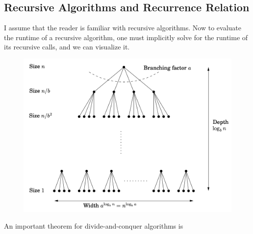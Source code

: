 \documentclass{article}
\begin{document}
  \subsection{Recursive Algorithms and Recurrence Relation}

    I assume that the reader is familiar with recursive algorithms. Now to evaluate the runtime of a recursive algorithm, one must implicitly solve for the runtime of its recursive calls, and we can visualize it. 

    \begin{figure}[H]
      \centering 
      \includegraphics[scale=0.4]{img/branching.png}
      \caption{} 
      \label{fig:branching}
    \end{figure}

    An important theorem for divide-and-conquer algorithms is 
\end{document}
